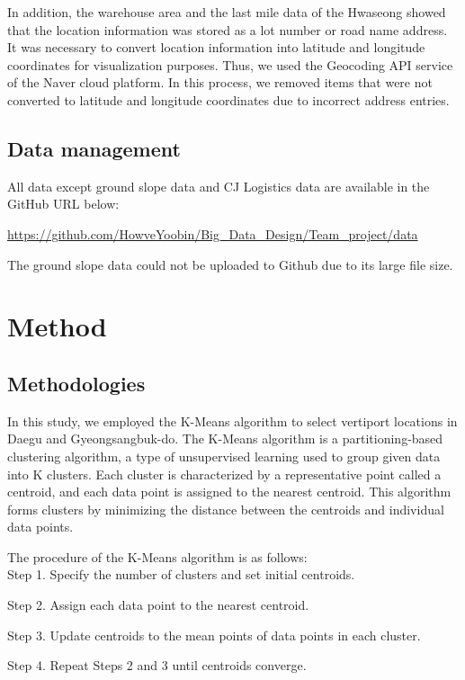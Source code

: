 \documentclass[11pt]{article}
\begin{document}
    In addition, the warehouse area and the last mile data of the Hwaseong showed that the location information was stored as a lot number or road name address. It was necessary to convert location information into latitude and longitude coordinates for visualization purposes. Thus, we used the Geocoding API service of the Naver cloud platform. In this process, we removed items that were not converted to latitude and longitude coordinates due to incorrect address entries.

    \subsection{Data management}
    All data except ground slope data and CJ Logistics data are available in the GitHub URL below:\
    
    \url{https://github.com/HowveYoobin/Big_Data_Design/Team_project/data}\

    The ground slope data could not be uploaded to Github due to its large file size.

    \section{Method}                       
    \subsection{Methodologies}

    In this study, we employed the K-Means algorithm to select vertiport locations in Daegu and Gyeongsangbuk-do. The K-Means algorithm is a partitioning-based clustering algorithm, a type of unsupervised learning used to group given data into K clusters. Each cluster is characterized by a representative point called a centroid, and each data point is assigned to the nearest centroid. This algorithm forms clusters by minimizing the distance between the centroids and individual data points.\

    The procedure of the K-Means algorithm is as follows:\\

    Step 1. Specify the number of clusters and set initial centroids.
    
    Step 2. Assign each data point to the nearest centroid.
    
    Step 3. Update centroids to the mean points of data points in each cluster.
    
    Step 4. Repeat Steps 2 and 3 until centroids converge.
    
\end{document}
